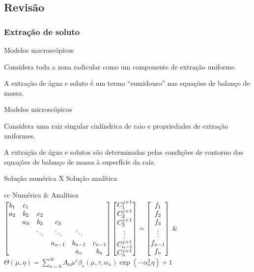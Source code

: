 \subsection{Revisão}
\begin{frame}\frametitle{Extração de soluto}
  \scriptsize 
  \begin{block}{Modelos macroscópicos}
    {\scriptsize 
      Considera toda a zona radicular como um componente de extração uniforme.

      A extração de água e soluto é um termo ``sumidouro'' nas equações de balanço de massa.
    }
  \end{block}
  \begin{block}{Modelos microscópicos}
    {\scriptsize 
      Considera uma raiz singular cinlíndrica de raio e propriedades de extração uniformes.

      A extração de água e solutos são determinadas pelas condições de contorno das equações de balanço de massa à superfície da raíz.
    }
  \end{block} \pause
  \begin{block}{Solução numérica X Solução analítica}
  \end{block}
  \bgroup
  \def\arraystretch{1.5}
  \begin{tabular}{cc}
    \scriptsize Numérica & \scriptsize Analítica \\
    \tiny
\(
 \begin{bmatrix}
 b_1 & c_1 & & & &  \\
 a_2 & b_2 & c_2 & & &  \\
  & a_3 & b_3 & c_3 & &  \\
  &  & \ddots & \ddots & \ddots &  \\
  &  & & a_{n-1} & b_{n-1} & c_{n-1}  \\
  &  & & & a_{n} & b_{n}  \cr \end{bmatrix}
 \begin{bmatrix}
 C^{j+1}_1 \\
 C^{j+1}_2 \\
 C^{j+1}_3 \\
 \vdots \\
 C^{j+1}_{n-1} \\
 C^{j+1}_n \\ \end{bmatrix}
=
 \begin{bmatrix}
 f_1 \\
 f_2 \\
 f_3 \\
 \vdots \\
 f_{n-1} \\
 f_n \\ \end{bmatrix}
\)
 & 
\tiny\(
\Theta(\mu,\eta) = \sum_{n=0}^\infty A_n \mu^v \beta_v(\mu,\tau,\alpha_n) \exp(-\alpha_n^2\eta)+1
\)    \\
  \end{tabular}
  \egroup
\end{frame}

